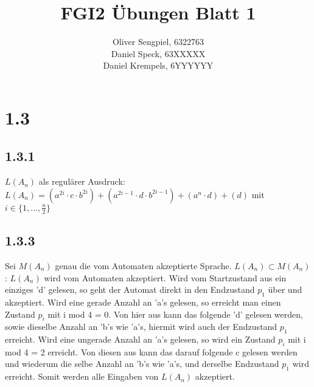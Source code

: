 \documentclass{article}
\title{FGI2 Übungen Blatt 1}
\author{Oliver Sengpiel, 6322763 \\
	Daniel Speck, 63XXXXX \\
	Daniel Krempels, 6YYYYYY}
\begin{document}
\maketitle

\section{1.3}
\subsection{1.3.1}
$L(A_n)$ als regulärer Ausdruck: \\
$L(A_n) = (a^{2i}\cdot c\cdot b^{2i}) + (a^{2i-1}\cdot d\cdot b^{2i-1}) +
(a^{n}\cdot d) + (d)$ mit $i \in \{1, \dots, \frac{n}{2} \}$

\subsection{1.3.3}
Sei $M(A_n)$ genau die vom Automaten akzeptierte Sprache.
$L(A_n) \subset M(A_n)$: $L(A_n)$ wird vom Automaten akzeptiert. Wird vom Startzustand aus ein einziges 'd' gelesen, so geht der Automat direkt in den Endzustand $p_1$ über und akzeptiert. Wird eine gerade Anzahl an 'a's gelesen, so erreicht man einen Zustand $p_i$ mit i mod 4 = 0. Von hier aus kann das folgende 'd' gelesen werden, sowie dieselbe Anzahl an 'b's wie 'a's, hiermit wird auch der Endzustand $p_1$ erreicht. Wird eine ungerade Anzahl an 'a's gelesen, so wird ein Zustand $p_i$ mit i mod 4 = 2 erreicht. Von diesen aus kann das darauf folgende c gelesen werden und wiederum die selbe Anzahl an 'b's wie 'a's, und derselbe Endzustand $p_1$ wird erreicht. Somit werden alle Eingaben von $L(A_n)$ akzeptiert. 
\end{document}
